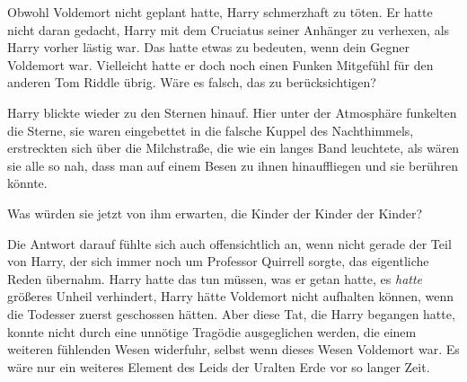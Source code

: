 Obwohl Voldemort nicht geplant hatte, Harry schmerzhaft zu töten. Er hatte nicht daran gedacht, Harry mit dem Cruciatus seiner Anhänger zu verhexen, als Harry vorher lästig war. Das hatte etwas zu bedeuten, wenn dein Gegner Voldemort war. Vielleicht hatte er doch noch einen Funken Mitgefühl für den anderen Tom Riddle übrig.
Wäre es falsch, das zu berücksichtigen?

Harry blickte wieder zu den Sternen hinauf. Hier unter der Atmosphäre funkelten die Sterne, sie waren eingebettet in die falsche Kuppel des Nachthimmels, erstreckten sich über die Milchstraße, die wie ein langes Band leuchtete, als wären sie alle so nah, dass man auf einem Besen zu ihnen hinauffliegen und sie berühren könnte.

Was würden sie jetzt von ihm erwarten, die Kinder der Kinder der Kinder?

Die Antwort darauf fühlte sich auch offensichtlich an, wenn nicht gerade der Teil von Harry, der sich immer noch um Professor Quirrell sorgte, das eigentliche Reden übernahm.
Harry hatte das tun müssen, was er getan hatte, es \emph{hatte} größeres Unheil verhindert, Harry hätte Voldemort nicht aufhalten können, wenn die Todesser zuerst geschossen hätten. Aber diese Tat, die Harry begangen hatte, konnte nicht durch eine unnötige Tragödie ausgeglichen werden, die einem weiteren fühlenden Wesen widerfuhr, selbst wenn dieses Wesen Voldemort war. Es wäre nur ein weiteres Element des Leids der Uralten Erde vor so langer Zeit.

